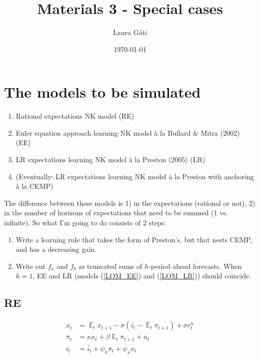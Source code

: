 \documentclass[11pt]{article}
\renewcommand{\[}{\begin{equation}}
\renewcommand{\]}{\end{equation}}
\DeclareMathOperator{\E}{\mathbb{E}}
\begin{document}
\linespread{1.0}

\title{Materials 3 - Special cases}
\author{Laura G\'ati} 
\date{\today}
\maketitle


\tableofcontents


\newpage
\section{The models to be simulated}
\begin{enumerate}
\item Rational expectations NK model (RE)
\item Euler equation approach learning NK model \`a la Bullard \& Mitra (2002)  (EE)
\item LR expectations learning NK model \`a la Preston (2005)  (LR)
\item (Eventually: LR expectations learning NK model \`a la Preston with anchoring \`a la CEMP)
\end{enumerate}

The difference between these models is 1) in the expectations (rational or not), 2) in the number of horizons of expectations that need to be summed (1 vs. infinite). So what I'm going to do consists of 2 steps: 
\begin{enumerate}
\item Write a learning rule that takes the form of Preston's, but that nests CEMP, and has a decreasing gain.
\item Write out $f_a$ and $f_b$ as truncated sums of $h$-period ahead forecasts. When $h=1$, EE and LR (models (\ref{LOM_EE}) and (\ref{LOM_LR})) should coincide.
\end{enumerate}

\subsection{RE}
\begin{align}
x_t &= \E_t x_{t+1} - \sigma(i_t - \E_t \pi_{t+1}) +\sigma r_t^n \label{NKIS} \\
\pi_t &= \kappa x_t +\beta \E_t \pi_{t+1} + u_t  \label{NKPC} \\
i_t &= \bar{i}_t + \psi_{\pi}\pi_t + \psi_{x} x_t  \label{TR}
\end{align}
\end{document}
